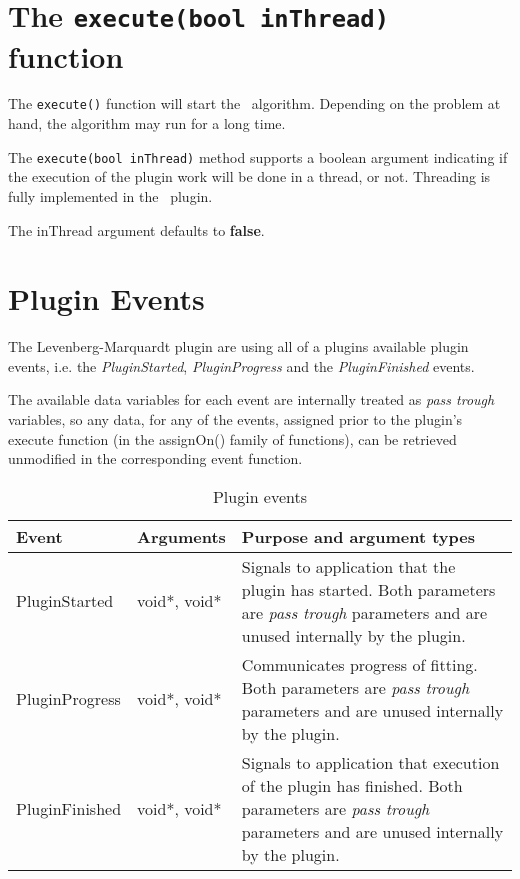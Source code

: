 \section{The \texttt{execute(bool inThread)} function}
The \verb|execute()| function will start the \pname\ algorithm. Depending on the problem at hand, the algorithm may run for a long time.

The \verb|execute(bool inThread)| method supports a boolean argument indicating if the execution of the plugin work will be done in a thread, or not. Threading is fully implemented in the \pname\ plugin.

The inThread argument defaults to \textbf{false}.


\section{Plugin Events}
The Levenberg-Marquardt plugin are using all of a plugins available plugin events, i.e. the \emph{PluginStarted}, \emph{PluginProgress} and the \emph{PluginFinished} events.

The available data variables for each event are internally treated as \emph{pass trough} variables, so any data, for any of the events, assigned prior to
the plugin's execute function (in the assignOn() family of functions), can be retrieved unmodified in the corresponding event function.

\begin{table}[ht]
\centering %
\begin{tabular}{l l p{9cm}}

Event & Arguments & Purpose and argument types \\ [0.5ex] %
\hline %
PluginStarted  	& 	void*, void*  & Signals to application that the plugin has started. Both parameters are \emph{pass trough} parameters and are unused internally by the plugin.\\[0.5ex]
PluginProgress	& 	void*, void*  & Communicates progress of fitting. Both parameters are \emph{pass trough} parameters and are unused internally by the plugin. \\[0.5ex]
PluginFinished	& 	void*, void*  & Signals to application that execution of the plugin has finished. Both parameters are \emph{pass trough} parameters and are unused internally by the plugin.\\

\hline %
\end{tabular}
\caption{Plugin events}
\label{table:lmfitPluginEvents}
\end{table}


